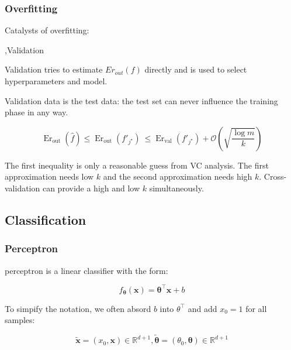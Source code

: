 \documentclass[10pt]{report}
\begin{document}

\subsubsection{Overfitting}

Catalysts of overfitting:


\sep{Validation}

Validation tries to estimate $Er_{out}(f)$ directly and is used to select hyperparameters and model.


Validation data is  the test data: the test set can never influence the training phase in any way.

\begin{equation}
    \operatorname{Er}_{\mathrm{out}}(\widehat{f})\leq\operatorname{Er}_{\mathrm{out}}(f'_{j^\star})~\leq\operatorname{Er}_{\mathrm{val}}(f'_{j^\star})+\mathcal{O}\left(\sqrt{\frac{\log m}{k}}\right)
\end{equation}

The first inequality is only a reasonable guess from VC analysis. The first approximation needs low $k$ and the second approximation needs high $k$. Cross-validation can provide a high and low $k$ simultaneously.

\subsection{Classification}

\subsubsection{Perceptron}

perceptron is a linear classifier with the form:

\[
    f_{\boldsymbol{\theta}}(\boldsymbol{x})=\boldsymbol{\theta}^\top\boldsymbol{x}+b
\]

To simpify the notation, we often absord $b$ into $\theta^\top$ and add $x_0=1$ for all samples:

\[
    \widetilde{\boldsymbol{x}}=(x_0,\boldsymbol{x})\in\mathbb{R}^{d+1}, \widetilde{\boldsymbol{\theta}}=(\theta_0,\boldsymbol{\theta})\in\mathbb{R}^{d+1}
\]
\end{document}

